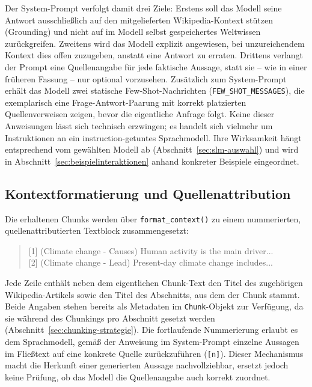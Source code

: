 Der System-Prompt verfolgt damit drei Ziele: Erstens soll das Modell seine Antwort
ausschließlich auf den mitgelieferten Wikipedia-Kontext stützen (Grounding) und nicht
auf im Modell selbst gespeichertes Weltwissen zurückgreifen. Zweitens wird das Modell
explizit angewiesen, bei unzureichendem Kontext dies offen zuzugeben, anstatt eine
Antwort zu erraten. Drittens verlangt der Prompt eine Quellenangabe für jede
faktische Aussage, statt sie -- wie in einer früheren Fassung -- nur optional
vorzusehen. Zusätzlich zum System-Prompt erhält das Modell zwei statische
Few-Shot-Nachrichten (\texttt{FEW\_\allowbreak{}SHOT\_\allowbreak{}MESSAGES}), die exemplarisch eine
Frage-Antwort-Paarung mit korrekt platzierten Quellenverweisen zeigen, bevor die
eigentliche Anfrage folgt. Keine dieser Anweisungen lässt sich technisch erzwingen;
es handelt sich vielmehr um Instruktionen an ein instruction-getuntes Sprachmodell. Ihre Wirksamkeit
hängt entsprechend vom gewählten Modell ab (Abschnitt~\ref{sec:slm-auswahl}) und wird
in Abschnitt~\ref{sec:beispielinteraktionen} anhand konkreter Beispiele eingeordnet.

\subsection{Kontextformatierung und Quellenattribution}

Die erhaltenen Chunks
werden über \texttt{format\_context()} zu einem nummerierten, quellenattributierten
Textblock zusammengesetzt:

\begin{quote}
\ttfamily\small\raggedright
[1] (Climate change - Causes) Human activity is the main driver...\\
{[2]} (Climate change - Lead) Present-day climate change includes...
\end{quote}

Jede Zeile enthält neben dem eigentlichen Chunk-Text den Titel des zugehörigen
Wikipedia-Artikels sowie den Titel des Abschnitts, aus dem der Chunk stammt. Beide
Angaben stehen bereits als Metadaten im \texttt{Chunk}-Objekt zur Verfügung, da sie
während des Chunkings pro Abschnitt gesetzt werden (Abschnitt~\ref{sec:chunking-strategie}).
Die fortlaufende Nummerierung erlaubt es dem Sprachmodell, gemäß der Anweisung im
System-Prompt einzelne Aussagen im Fließtext auf eine konkrete Quelle zurückzuführen
(\texttt{[n]}). Dieser Mechanismus macht die Herkunft einer generierten Aussage
nachvollziehbar, ersetzt jedoch keine Prüfung, ob das Modell die Quellenangabe auch
korrekt zuordnet.


